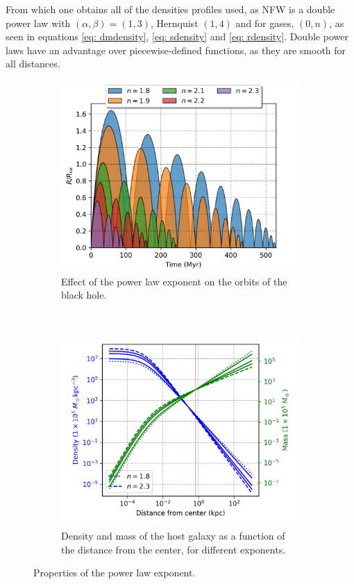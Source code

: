 		From which one obtains all of the densities profiles used, as NFW is a double power law with $(\alpha, \beta) = (1, 3)$, Hernquist $(1, 4)$ and for gases, $(0, n)$, as seen in equations \ref{eq: dmdensity}, \ref{eq: sdensity} and \ref{eq: rdensity}. Double power laws have an advantage over piecewise-defined functions, as they are smooth for all distances. 		
		\begin{figure}[h]
			\centering
			\begin{subfigure}[t]{0.49\textwidth}
				\includegraphics[width = \textwidth]{"../Files/Week 6/power_law"}
				\caption{Effect of the power law exponent on the orbits of the black hole.}
				\label{fig: powerLawOrbits}
			\end{subfigure}
			~ 
			\begin{subfigure}[t]{0.49\textwidth}
				\includegraphics[width=\textwidth]{"../Files/Week 6/power_law_density"}
				\caption{Density and mass of the host galaxy as a function of the distance from the center, for different exponents.}
				\label{fig: powerLawDensities}
			\end{subfigure}
			\caption{Properties of the power law exponent.}
			\label{fig: powerLaw}
		\end{figure}
	
